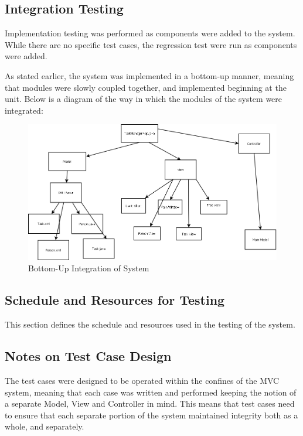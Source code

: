 \documentclass[12pt]{article}
\begin{document}
\subsection{Integration Testing}
{
Implementation testing was performed as components were added to the system. While there are no specific test cases, the regression test were run as components were added.

As stated earlier, the system was implemented in a bottom-up manner, meaning that modules were slowly coupled together, and implemented beginning at the unit. Below is a diagram of the way in which the modules of the system were integrated:

\begin{figure}[htbp]

\begin{center} \includegraphics[scale=.3]{inc3_bottomup.png} \end{center}
\label{fig:bottom-up-diagram}
\caption{Bottom-Up Integration of System}

\end{figure}

}
\subsection{Schedule and Resources for Testing}
{
This section defines the schedule and resources used in the testing of the system.
}

\subsection{Notes on Test Case Design}
{
The test cases were designed to be operated within the confines of the MVC system, meaning that each case was written and performed keeping the notion of a separate Model, View and Controller in mind. This means that test cases need to ensure that each separate portion of the system maintained integrity both as a whole, and separately.
}
\end{document}
